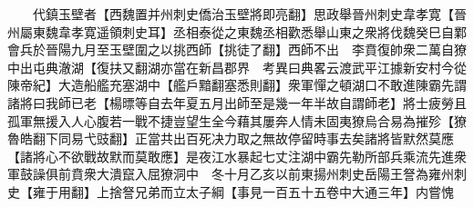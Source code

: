　　代鎮玉壁者【西魏置并州刺史僑治玉壁將即亮翻】思政舉晉州刺史韋孝寛【晉州屬東魏韋孝寛遥領刺史耳】丞相泰從之東魏丞相歡悉舉山東之衆將伐魏癸巳自鄴會兵於晉陽九月至玉壁圍之以挑西師【挑徒了翻】西師不出　李賁復帥衆二萬自獠中出屯典澈湖【復扶又翻湖亦當在新昌郡界　考異曰典畧云渡武平江據新安村今從陳帝紀】大造船艦充塞湖中【艦戶黯翻塞悉則翻】衆軍憚之頓湖口不敢進陳霸先謂諸將曰我師已老【楊㬓等自去年夏五月出師至是幾一年半故自謂師老】將士疲勞且孤軍無援入人心腹若一戰不捷豈望生全今藉其屢奔人情未固夷獠烏合易為摧殄【獠魯皓翻下同易弋豉翻】正當共出百死决力取之無故停留時事去矣諸將皆默然莫應【諸將心不欲戰故默而莫敢應】是夜江水暴起七丈注湖中霸先勒所部兵乘流先進衆軍鼓譟俱前賁衆大潰竄入屈獠洞中　冬十月乙亥以前東揚州刺史岳陽王詧為雍州刺史【雍于用翻】上捨詧兄弟而立太子綱【事見一百五十五卷中大通三年】内嘗愧